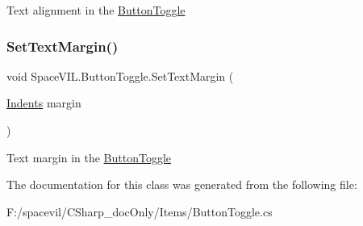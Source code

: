 Text alignment in the \mbox{\hyperlink{class_space_v_i_l_1_1_button_toggle}{Button\+Toggle}} 

\mbox{\label{class_space_v_i_l_1_1_button_toggle_a387ba36cf18f799bbb64615e4925f160}} 
\subsubsection{\texorpdfstring{Set\+Text\+Margin()}{SetTextMargin()}}
{\footnotesize\ttfamily void Space\+V\+I\+L.\+Button\+Toggle.\+Set\+Text\+Margin (\begin{DoxyParamCaption}\item[{\mbox{\hyperlink{struct_space_v_i_l_1_1_decorations_1_1_indents}{Indents}}}]{margin }\end{DoxyParamCaption})}



Text margin in the \mbox{\hyperlink{class_space_v_i_l_1_1_button_toggle}{Button\+Toggle}} 



The documentation for this class was generated from the following file\+:\begin{DoxyCompactItemize}
\item 
F\+:/spacevil/\+C\+Sharp\+\_\+doc\+Only/\+Items/Button\+Toggle.\+cs\end{DoxyCompactItemize}
